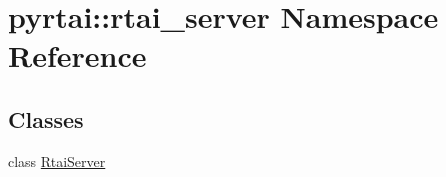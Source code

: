 \hypertarget{namespacepyrtai_1_1rtai__server}{
\section{pyrtai\-:\-:rtai\-\_\-server \-Namespace \-Reference}
\label{namespacepyrtai_1_1rtai__server}
}
\subsection*{\-Classes}
\begin{DoxyCompactItemize}
\item 
class \hyperlink{classpyrtai_1_1rtai__server_1_1_rtai_server}{\-Rtai\-Server}
\end{DoxyCompactItemize}
